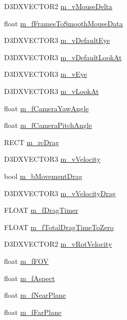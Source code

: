 \begin{DoxyCompactItemize}
\item 
D3DXVECTOR2 \hyperlink{class_c_base_camera_ab884ec4d7972fed1319ed867a542f041}{m\_\-vMouseDelta}
\item 
float \hyperlink{class_c_base_camera_af9b4d43933754929e66403e0435d6387}{m\_\-fFramesToSmoothMouseData}
\item 
D3DXVECTOR3 \hyperlink{class_c_base_camera_a71147e92520e8965eac70517585ffe3c}{m\_\-vDefaultEye}
\item 
D3DXVECTOR3 \hyperlink{class_c_base_camera_ad3dd204ec2e0c44f6757ea3ac83a4f6e}{m\_\-vDefaultLookAt}
\item 
D3DXVECTOR3 \hyperlink{class_c_base_camera_aa7b7cd1276331e8ab614e04ddcde14e7}{m\_\-vEye}
\item 
D3DXVECTOR3 \hyperlink{class_c_base_camera_a0c773d85e2ca0bf6eaf60e90478b6520}{m\_\-vLookAt}
\item 
float \hyperlink{class_c_base_camera_afe69549c26475e5d4f577cf8d2dce8cb}{m\_\-fCameraYawAngle}
\item 
float \hyperlink{class_c_base_camera_afa9c9ae13a628b3dc352b6985d3a1acc}{m\_\-fCameraPitchAngle}
\item 
RECT \hyperlink{class_c_base_camera_a1a22483b3f168a945864e5fd156ca820}{m\_\-rcDrag}
\item 
D3DXVECTOR3 \hyperlink{class_c_base_camera_abce9d814274b2bdb4da95fc3b3dca575}{m\_\-vVelocity}
\item 
bool \hyperlink{class_c_base_camera_abbd0b30b993e305bc7deb7a985a3ea8b}{m\_\-bMovementDrag}
\item 
D3DXVECTOR3 \hyperlink{class_c_base_camera_a541e0833b62dac8d0dcff9f95be9220f}{m\_\-vVelocityDrag}
\item 
FLOAT \hyperlink{class_c_base_camera_aae76e8c993f56e6b21fa64b3bf0ee58a}{m\_\-fDragTimer}
\item 
FLOAT \hyperlink{class_c_base_camera_a39abb4e2ffe603d95bc1f80c3b7e7c86}{m\_\-fTotalDragTimeToZero}
\item 
D3DXVECTOR2 \hyperlink{class_c_base_camera_a462bb1b209e135dcaab3d95e7e709512}{m\_\-vRotVelocity}
\item 
float \hyperlink{class_c_base_camera_ad480f1dc8ae654fc126cc2dfb57a1ec0}{m\_\-fFOV}
\item 
float \hyperlink{class_c_base_camera_a605bbe3c728cc72c3f7dcae3c0bac16e}{m\_\-fAspect}
\item 
float \hyperlink{class_c_base_camera_ac4d819f24b173b951db77377c20f33a1}{m\_\-fNearPlane}
\item 
float \hyperlink{class_c_base_camera_a667fbeae2b0445a30819109cd745764a}{m\_\-fFarPlane}

\end{DoxyCompactItemize}
